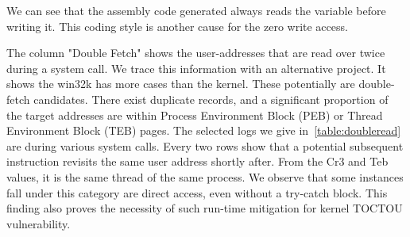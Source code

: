 We can see that the assembly code generated always reads the variable before writing it. This coding style is another cause for the zero write access. 


%
%
%



The column "Double Fetch" shows the user-addresses that are read over twice during a system call. We trace this information with an alternative project. It shows the win32k has more cases than the kernel. These potentially are double-fetch candidates. There exist duplicate records, and a significant proportion of the target addresses are within Process Environment Block (PEB) or Thread Environment Block (TEB) pages.  The selected logs we give in~\autoref{table:doubleread} are during various system calls.  Every two rows show that a potential subsequent instruction revisits the same user address shortly after. From the Cr3 and Teb values, it is the same thread of the same process. We observe that some instances fall under this category are direct access, even without a try-catch block. This finding also proves the necessity of such run-time mitigation for kernel TOCTOU vulnerability.


